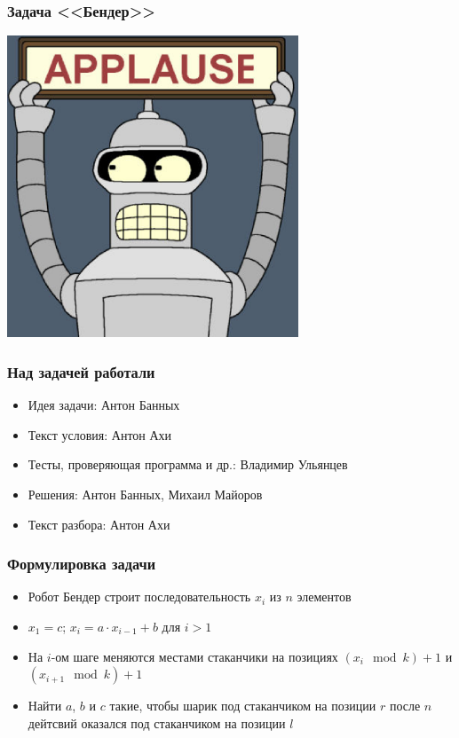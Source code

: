 
\begin{frame}
  \frametitle{Задача <<Бендер>>}
  \begin{center}
    \includegraphics[height=9cm]{bender.eps}
  \end{center}
\end{frame}

\begin{frame}
  \frametitle{Над задачей работали}
  \begin{itemize}
    \item Идея задачи: Антон Банных
    \item Текст условия: Антон Ахи
    \item Тесты, проверяющая программа и др.: Владимир Ульянцев
    \item Решения: Антон Банных, Михаил Майоров 
    \item Текст разбора: Антон Ахи
  \end{itemize}
\end{frame}

\begin{frame}
  \frametitle{Формулировка задачи}
  \begin{itemize}
    \item Робот Бендер строит последовательность $x_i$ из $n$ элементов
    \item $x_1 = c$; $x_i = a \cdot x_{i - 1} + b$ для $i > 1$
    \item На $i$-ом шаге меняются местами стаканчики на позициях $(x_i \mod k) + 1$ и
    		$(x_{i + 1} \mod k) + 1$
    \item Найти $a$, $b$ и $c$ такие, чтобы шарик под стаканчиком на позиции $r$ после $n$ дейтсвий
    		оказался под стаканчиком на позиции $l$  
  \end{itemize}
\end{frame}

